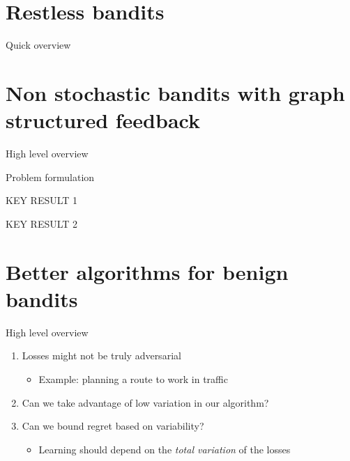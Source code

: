 \documentclass{beamer}
\begin{document}
\section{Restless bandits}

\begin{frame}{Quick overview}
\end{frame}

\section{Non stochastic bandits with graph structured feedback}
\begin{frame}{High level overview}

\end{frame} 

\begin{frame}{Problem formulation}

\end{frame}

\begin{frame}{KEY RESULT 1}
\end{frame}

\begin{frame}{KEY RESULT 2}

\end{frame}
\section{Better algorithms for benign bandits}
\begin{frame}{High level overview}

  \begin{enumerate}
  \item
    Losses might not be truly adversarial
    \begin{itemize}   
    \item
      Example: planning a route to work in traffic
    \end{itemize}
    \item
      Can we take advantage of low variation in our algorithm?
    \item
       Can we bound regret based on variability?
      \begin{itemize}
        \item
          Learning should depend on the \textit{total variation} of the losses
        \end{itemize}
  \end{enumerate}
\end{frame}
\end{document}
